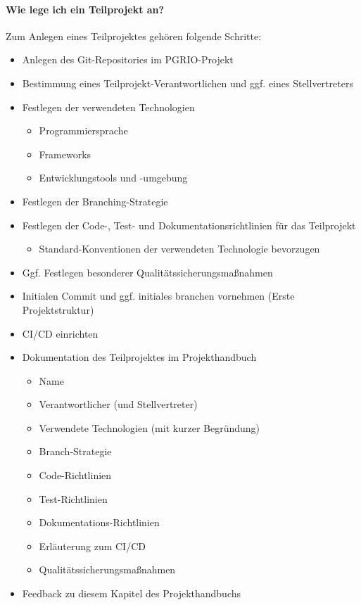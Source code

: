 \paragraph{Wie lege ich ein Teilprojekt an?}
Zum Anlegen eines Teilprojektes gehören folgende Schritte:
\begin{itemize}
	\item Anlegen des Git-Repositories im PGRIO-Projekt
	\item Bestimmung eines Teilprojekt-Verantwortlichen und ggf. eines Stellvertreters
	\item Festlegen der verwendeten Technologien
	\begin{itemize}
		\item Programmiersprache
		\item Frameworks
		\item Entwicklungstools und -umgebung
	\end{itemize}	
	\item Festlegen der Branching-Strategie
	\item Festlegen der Code-, Test- und Dokumentationsrichtlinien für das Teilprojekt
	\begin{itemize}
		\item Standard-Konventionen der verwendeten Technologie bevorzugen
	\end{itemize}
	\item Ggf. Festlegen besonderer Qualitätssicherungsmaßnahmen
	\item Initialen Commit und ggf. initiales branchen vornehmen (Erste Projektstruktur)
	\item CI/CD einrichten
	\item Dokumentation des Teilprojektes im Projekthandbuch
	\begin{itemize}
		\item Name
		\item Verantwortlicher (und Stellvertreter)
		\item Verwendete Technologien (mit kurzer Begründung)
		\item Branch-Strategie
		\item Code-Richtlinien
		\item Test-Richtlinien
		\item Dokumentations-Richtlinien
		\item Erläuterung zum CI/CD
		\item Qualitätssicherungsmaßnahmen
	\end{itemize}	
	\item Feedback zu diesem Kapitel des Projekthandbuchs
\end{itemize}

